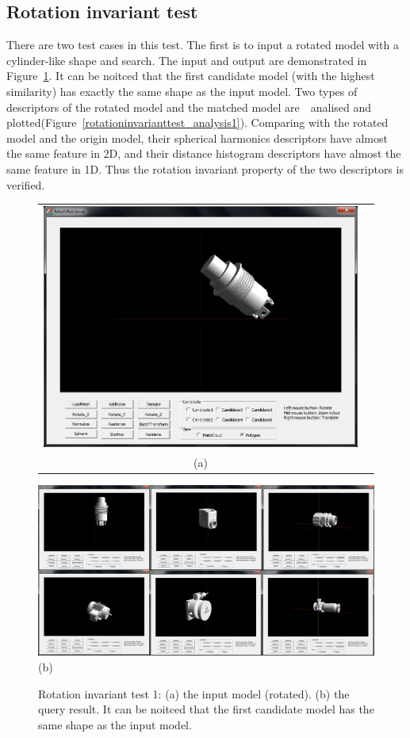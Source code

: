 \subsection{Rotation invariant test} \label{sec:results_rotationinvarianttest}

There are two test cases in this test. The first is to input a rotated model with a cylinder-like shape and search. The input and output are demonstrated in Figure~\ref{noiseinvarianttest_UI1}.  It can be noitced that the first candidate model (with the highest similarity) has exactly the same shape as the input model. Two types of descriptors of the rotated model and the matched model are　analised and plotted(Figure~\ref{rotationinvarianttest_analysis1}). Comparing with the rotated model and the origin model, their spherical harmonics descriptors have almost the same feature in 2D, and their distance histogram descriptors have almost the same feature in 1D. Thus the rotation invariant property of the two descriptors is verified.

\begin{figure}
\begin{center}
\begin{tabular}{cc}   %
   \includegraphics[width=0.6\linewidth]{input_rotationinvariant_test10}  \\
   (a) \\
\end{tabular}
   \includegraphics[width=1\linewidth]{output_rotationinvariant_test10}  \\
   (b)  \\
\caption{Rotation invariant test 1: (a) the input model (rotated). (b) the query result. It can be noitced that the first candidate model has the same shape as the input model.} 
  \label{noiseinvarianttest_UI1}
\end{center}
\end{figure}

